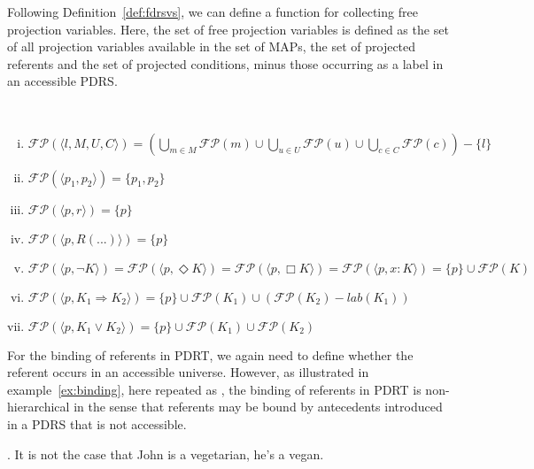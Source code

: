 \noindent Following Definition~\ref{def:fdrsvs}, we can define a function
for collecting free projection variables. Here, the set of free projection
variables is defined as the set of all projection variables available in the
set of MAPs, the set of projected referents and the set of projected
conditions, minus those occurring as a label in an accessible PDRS.

\begin{definition}\label{def:def:fpvs}~
  \begin{enumerate}[i.]
    \item $\mathcal{FP}(\langle l, M, U, C \rangle) 
          = (\bigcup_{m\in M} \mathcal{FP}(m)
            \cup \bigcup_{u\in U} \mathcal{FP}(u) 
            \cup \bigcup_{c\in C} \mathcal{FP}(c)) - \{l\}$
    \item $\mathcal{FP}(\langle p_1, p_2\rangle) = \{p_1, p_2\}$
    \item $\mathcal{FP}(\langle p, r\rangle) = \{p\}$
    \item $\mathcal{FP}(\langle p, R(...)\rangle) = \{p\}$
    \item $\mathcal{FP}(\langle p,\neg K\rangle)
          = \mathcal{FP}(\langle p,\Diamond K\rangle)
          = \mathcal{FP}(\langle p,\Box K\rangle)
          = \mathcal{FP}(\langle p,x:K\rangle) 
          = \{p\} \cup \mathcal{FP}(K)$
    \item $\mathcal{FP}(\langle p,K_1 \Rightarrow K_2\rangle) 
          = \{p\}\cup \mathcal{FP}(K_1)
            \cup (\mathcal{FP}(K_2) - lab(K_1))$
    \item $\mathcal{FP}(\langle p,K_1 \vee K_2\rangle) 
          = \{p\}\cup \mathcal{FP}(K_1) \cup \mathcal{FP}(K_2)$
  \end{enumerate}
\end{definition}

For the binding of referents in PDRT, we again need to define whether the
referent occurs in an accessible universe.  However, as illustrated in
example~\ref{ex:binding}, here repeated as \Next, the binding of referents
in PDRT is non-hierarchical in the sense that referents may be bound by
antecedents introduced in a PDRS that is not accessible.

\ex. It is not the case that John is a vegetarian, he's a vegan.\\
\label{ex:binding_rep}

